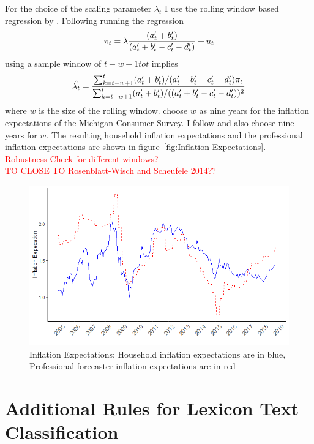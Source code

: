 \documentclass[review]{elsarticle}
\begin{document}
For the choice of the scaling parameter $\lambda_t$ I use the rolling window based regression by \cite{Lahiri2015}. Following \cite{Rosenblatt-Wisch2015} running the regression
\begin{align*}
\pi_t = \lambda \frac{(a_t\sp{\prime} + b_t\sp{\prime})}{(a_t\sp{\prime} + b_t\sp{\prime} - c_t\sp{\prime} - d_t\sp{\prime})} + u_t 
\end{align*}
using a sample window of $t - w + 1 to t$ implies
\begin{align*}
\hat{\lambda_t} = \frac{\sum^t_{k = t-w+1}(a_t\sp{\prime} + b_t\sp{\prime})/(a_t\sp{\prime} + b_t\sp{\prime} - c_t\sp{\prime} - d_t\sp{\prime})\pi_t}{\sum^t_{k = t-w+1}(a_t\sp{\prime} + b_t\sp{\prime})/((a_t\sp{\prime} + b_t\sp{\prime} - c_t\sp{\prime} - d_t\sp{\prime}))^2}
\end{align*}
where $w$ is the size of the rolling window. \cite{Lahiri2015} choose $w$ as nine years for the inflation expectations of the Michigan Consumer Survey. I follow \cite{Lahiri2015} and also choose nine years for $w$. The resulting household inflation expectations and the professional inflation expectations are shown in figure~\ref{fig:Inflation Expectations}.
\\
\textcolor{red}{Robustness Check for different windows?}
\\
\textcolor{red}{TO CLOSE TO Rosenblatt-Wisch and Scheufele 2014??}

  \begin{figure}[h!]
    \centering
    \includegraphics{household_prof_inf.png}
    \caption{Inflation Expectations: Household inflation expectations are in blue, Professional forecaster inflation expectations are in red}
    \end{figure}
\label{fig:Inflation Expectations}

\section{Additional Rules for Lexicon Text Classification}\label{sec:Additional Rules for Lexicon Text Classification}
\end{document}
